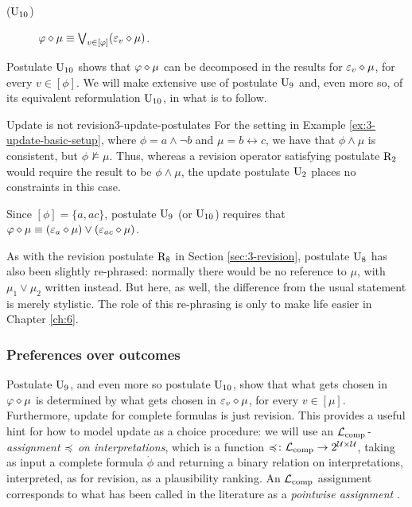 \begin{description}
	\item[($\mathrm{U}_{10}$)] $\varphi\diamond\mu\equiv \bigvee_{v\in[\varphi]}(\varepsilon_{v}\diamond\mu)$.
\end{description}

Postulate $\mathrm{U}_{10}$ shows that $\varphi\diamond\mu$ can be decomposed
in the results for $\varepsilon_{v}\diamond\mu$, for every $v\in[\phi]$. 
We will make extensive use of postulate $\mathrm{U}_{9}$ and, even more so, 
of its equivalent reformulation $\mathrm{U}_{10}$, 
in what is to follow.

\begin{xmpl}{Update is not revision}{3-update-postulates}
	For the setting in Example \ref{ex:3-update-basic-setup},
	where $\phi = a\land\lnot b$
	and $\mu=b\leftrightarrow c$,
	we have that $\phi\land\mu$ is consistent,
	but $\phi\not\models\mu$.
	Thus, whereas a revision operator satisfying postulate $\mathrm{R}_{2}$ 
	would require the result to be $\phi\land\mu$,
	the update postulate $\mathrm{U}_{2}$ places no constraints in this case.

	Since $[\phi]=\{a,ac\}$, 
	postulate $\mathrm{U}_{9}$ (or $\mathrm{U}_{10}$) requires that 
	$\varphi\diamond\mu\equiv(\varepsilon_{a}\diamond\mu)\lor(\varepsilon_{ac}\diamond\mu)$.
\end{xmpl}

As with the revision postulate $\mathrm{R}_{8}$ in Section \ref{sec:3-revision},
postulate $\mathrm{U}_{8}$ has also been slightly re-phrased:
normally there would be no reference to $\mu$, 
with $\mu_{1}\lor\mu_{2}$ written instead.
But here, as well, the difference from the usual statement 
is merely stylistic. 
The role of this re-phrasing is only to make life easier
in Chapter \ref{ch:6}.

\subsubsection{Preferences over outcomes}
Postulate $\mathrm{U}_{9}$, and even more so postulate $\mathrm{U}_{10}$,
show that what gets chosen in $\varphi\diamond\mu$ is determined 
by what gets chosen in $\varepsilon_{v}\diamond\mu$,
for every $v\in[\mu]$.
Furthermore, update for complete formulas is just revision.
This provides a useful hint for how to model update as a choice
procedure:
we will use an
\emph{$\mathcal{L}_{{\operatorname{comp}}}$-assignment $\preccurlyeq$ on interpretations}, 
which is a function $\preccurlyeq\colon\mathcal{L}_{{\operatorname{comp}}}\rightarrow 2^{\mathcal{U}\times\mathcal{U}}$,
taking as input a complete formula $\dot{\phi}$ and returning
a binary relation on interpretations, 
interpreted, as for revision, as a plausibility ranking.
An $\mathcal{L}_{{\operatorname{comp}}}$ assignment corresponds to 
what has been called in the literature as a \emph{pointwise assignment}
\cite{KatsunoM91}.

